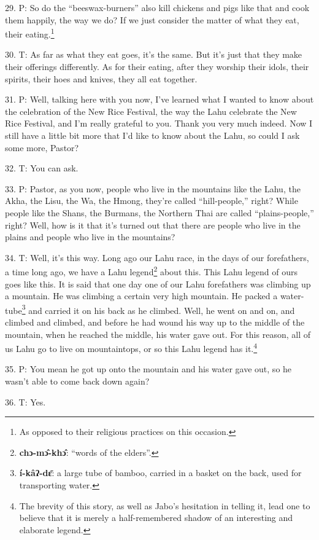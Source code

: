 29. P: So do the ``beeswax-burners'' also kill chickens and pigs
like that and cook them happily, the way we do? If we just consider the matter
of what they eat, their eating.\footnote{As opposed to their religious practices on this occasion.}

30. T: As far as what they eat goes, it's the same. But it's just that they make
their offerings differently. As for their eating, after they worship their idols,
their spirits, their hoes and knives, they all eat together.

31. P: Well, talking here with you now, I've learned what I wanted to know about
the celebration of the New Rice Festival, the way the Lahu celebrate the New Rice
Festival, and I'm really grateful to you. Thank you very much indeed. Now I still
have a little bit more that I'd like to know about the Lahu, so could I ask some
more, Pastor?

32. T: You can ask.

33. P: Pastor, as you now, people who live in the mountains like the Lahu, the Akha,
the Lisu, the Wa, the Hmong, they're called ``hill-people,'' right?
While people like the Shans, the Burmans, the Northern Thai are called ``plains-people,''
right? Well, how is it that it's turned out that there are people who live in the
plains and people who live in the mountains?

34. T: Well, it's this way. Long ago our Lahu race, in the days of our forefathers,
a time long ago, we have a Lahu legend\footnote{\textbf{chɔ-mɔ̂-khɔ̂}: ``words of the elders''.} about this. This Lahu legend of ours
goes like this. It is said that one day one of our Lahu forefathers was climbing
up a mountain. He was climbing a certain very high mountain. He packed a water-tube\footnote{\textbf{í-kâʔ-dɛ̄}: a large tube of bamboo, carried in a basket on the back, used for transporting water.}
and carried it on his back as he climbed. Well, he went on and on, and climbed
and climbed, and before he had wound his way up to the middle of the mountain,
when he reached the middle, his water gave out. For this reason, all of us Lahu
go to live on mountaintops, or so this Lahu legend has it.\footnote{The brevity of this story, as well as Jabo's hesitation in telling it, lead one to believe that it is merely a half-remembered shadow of an interesting and elaborate legend.}

35. P: You mean he got up onto the mountain and his water gave out, so he wasn't
able to come back down again?

36. T: Yes.

